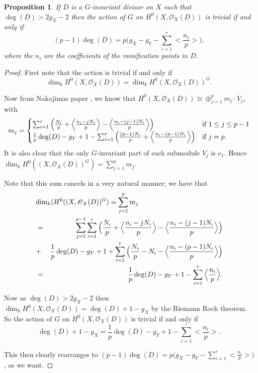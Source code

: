 \documentclass[11pt]{article} %
\newtheorem{prop}{Proposition}
\begin{document}
\begin{prop}
	If $D$ is a $G$-invariant divisor on $X$ such that $\deg(D)>2g_X-2$ then the action of $G$ on 
	$H^0(X,\mathscr{O}_X(D))$ is trivial if and only if
		\[ 
		(p-1)\deg(D)=p\Big(g_X-g_Y-\sum_{i=1}^r\Big<\frac{n_i}{p}\Big>\Big),
		\]
	where the $n_i$ are the coefficients of the ramification points in $D$. 
\end{prop}
\begin{proof}
	First note that the action is trivial if and only if
		\[
		\dim_kH^0(X,\mathscr{O}_X(D))=\dim_kH^0(X,\mathscr{O}_X(D))^G.
		\]

	Now from Nakajimas paper \citep{naka}, we know that $H^0(X,\mathscr{O}_X(D))\cong \oplus _{j=1}^p m_j\cdot V_j$, with 
	\begin{equation*}
		m_j=
			\begin{cases}
				\sum_{i=1}^r\Big(\frac{N_i}{p}+\Big{<}\frac{n_i-jN_i}{p}\Big{>}-\Big{<}\frac{n_i-(j-1)N_i}{p}\Big{>}\Big) & \mbox{if }1\leq j\leq p-1 \\
				\frac{1}{p}\deg(D)-g_Y+1-\sum_{i=1}^r\Big(\frac{(p-1)N_i}{p}+\Big<\frac{n_i-(p-1)N_i}{p}\Big>\Big) & \mbox{if }j=p.
			\end{cases}
	\end{equation*}
	It is also clear that the only $G$-invariant part of each submodule $V_j$ is $e_1$. Hence $\dim_kH^0((X,\mathscr{O}_X(D))^G) = \sum_{j=1}^p m_j$.

	Note that this sum cancels in a very natural manner; we have that
	\begin{eqnarray*}
		\lefteqn{\dim_k(H^0((X,\mathscr{O}_X(D))^G) = \sum_{j=1}^p m_j} \\
		& = & \sum_{j=1}^{p-1}  \sum_{i=1}^r\Big(\frac{N_i}{p}+\Big<\frac{n_i-jN_i}{p}\Big>-\Big<\frac{n_i-(j-1)N_i}{p}\Big>\Big) \\
		& + & \frac{1}{p}\deg(D)-g_Y+1+\sum_{i=1}^r\Big(\frac{N_i}{p}-N_i-\Big<\frac{n_i-(p-1)N_i}{p}\Big>\Big) \\
		& = & \frac{1}{p}\deg(D)-g_Y+1-\sum_{i=1}^r \Big<\frac{n_i}{p}\Big>.
	\end{eqnarray*}

	Now as $\deg(D)>2g_X-2$ then $\dim_kH^0(X,\mathscr{O}_X(D)) =\deg(D)+1-g_X$ by the Riemann Roch theorem. 
	So the action of $G$ on $H^0(X,\mathscr{O}_X(D))$ is trivial if and only if
	\begin{equation*}
		\deg(D)+1-g_X  = \frac{1}{p}\deg(D)-g_Y+1-\sum_{i=1}^r\Big<\frac{n_i}{p}\Big>. \label{hi}
	\end{equation*}

This then clearly rearranges to $(p-1)\deg(D)=p\Big(g_X-g_Y-\sum_{i=1}^r\Big<\frac{n_i}{p}\Big>\Big)$, as we want.
\end{proof}
\end{document}
